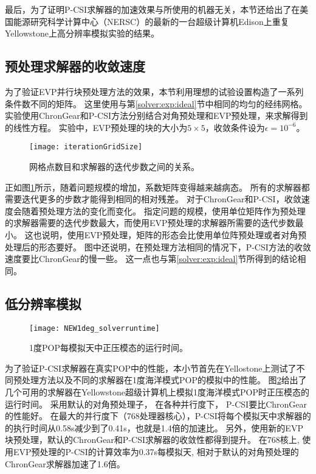最后，为了证明P-CSI求解器的加速效果与所使用的机器无关，本节还给出了在美国能源研究科学计算中心（NERSC）的最新的一台超级计算机Edison上重复Yellowstone上高分辨率模拟实验的结果。



\subsection{预处理求解器的收敛速度}\label{precond:exp:ideal}

为了验证EVP并行块预处理方法的效果，本节利用理想的试验设置构造了一系列条件数不同的矩阵。
这里使用与第\ref{solver:exp:ideal}节中相同的均匀的经纬网格。
实验使用ChronGear和P-CSI方法分别结合对角预处理和EVP预处理，来求解得到的线性方程。
实验中，EVP预处理的块的大小为$5\times5$，收敛条件设为$\epsilon = 10^{-6}$。 
 

\begin{figure} 
\vspace{5pt}
\centering
\texttt{[image: iterationGridSize]}
\caption[] {网格点数目和求解器的迭代步数之间的关系。\label{fig:iterationGridSizePrecond}}
\end{figure}

正如图\ref{fig:iterationGridSizePrecond}所示，随着问题规模的增加，系数矩阵变得越来越病态。
所有的求解器都需要迭代更多的步数才能得到相同的相对残差。
对于ChronGear和P-CSI，收敛速度会随着预处理方法的变化而变化。 
指定问题的规模，使用单位矩阵作为预处理的求解器需要的迭代步数最大，而使用EVP预处理的求解器所需要的迭代步数最小。 
这也说明，使用EVP预处理，矩阵的形态会比使用单位阵预处理或者对角预处理后的形态要好。 
图中还说明，在预处理方法相同的情况下，P-CSI方法的收敛速度要比ChronGear的慢一些。 
这一点也与第\ref{solver:exp:ideal}节所得到的结论相同。 


\subsection{低分辨率模拟}
\label{precond:exp:low}
\begin {figure}[!ht]
\centering
\texttt{[image: NEW1deg\_solverruntime]}
\caption []{1度POP每模拟天中正压模态的运行时间。\label {fig:runtime1}}
\end {figure}
为了验证P-CSI求解器在真实POP中的性能，本小节首先在Yellostone上测试了不同预处理方法以及不同的求解器在1度海洋模式POP的模拟中的性能。
图\ref{fig:runtime1}给出了几个可用的求解器在Yellowstone超级计算机上模拟1度海洋模式POP时正压模态的运行时间。  
采用默认的对角预处理子， 在各种并行度下， P-CSI要比ChronGear的性能好。
在最大的并行度下（768处理器核心），P-CSI将每个模拟天中求解器的的执行时间从0.58s减少到了0.41s，也就是1.4倍的加速比。 
另外，使用新的EVP块预处理，默认的ChronGear和P-CSI求解器的收敛性都得到提升。 
在768核上, 使用EVP预处理的P-CSI的计算效率为0.37s每模拟天, 相对于默认的对角预处理的ChronGear求解器加速了1.6倍。 



